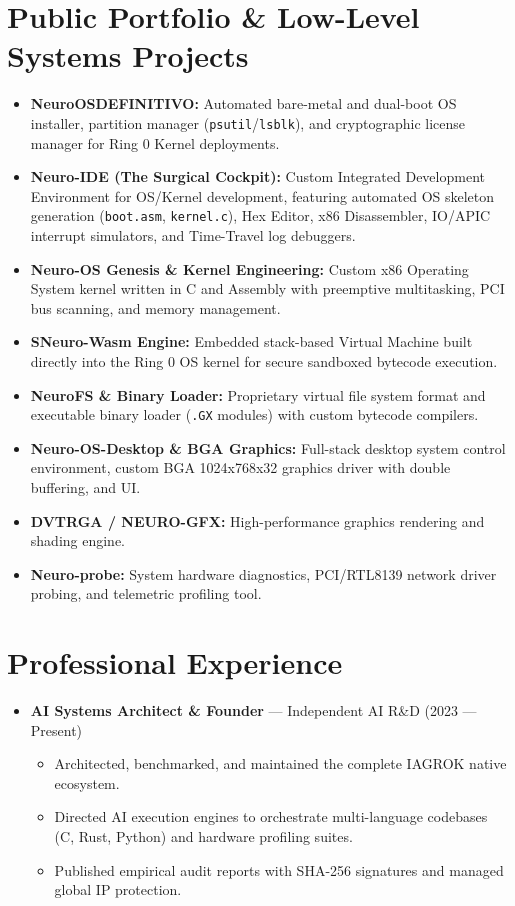 \documentclass[11pt,a4paper,sans]{moderncv}
\begin{document}
\section{Public Portfolio \& Low-Level Systems Projects}
\begin{itemize}
\item \textbf{NeuroOSDEFINITIVO:} Automated bare-metal and dual-boot OS installer, partition manager (\texttt{psutil}/\texttt{lsblk}), and cryptographic license manager for Ring 0 Kernel deployments.
\item \textbf{Neuro-IDE (The Surgical Cockpit):} Custom Integrated Development Environment for OS/Kernel development, featuring automated OS skeleton generation (\texttt{boot.asm}, \texttt{kernel.c}), Hex Editor, x86 Disassembler, IO/APIC interrupt simulators, and Time-Travel log debuggers.
\item \textbf{Neuro-OS Genesis \& Kernel Engineering:} Custom x86 Operating System kernel written in C and Assembly with preemptive multitasking, PCI bus scanning, and memory management.
\item \textbf{SNeuro-Wasm Engine:} Embedded stack-based Virtual Machine built directly into the Ring 0 OS kernel for secure sandboxed bytecode execution.
\item \textbf{NeuroFS \& Binary Loader:} Proprietary virtual file system format and executable binary loader (\texttt{.GX} modules) with custom bytecode compilers.
\item \textbf{Neuro-OS-Desktop \& BGA Graphics:} Full-stack desktop system control environment, custom BGA 1024x768x32 graphics driver with double buffering, and UI.
\item \textbf{DVTRGA / NEURO-GFX:} High-performance graphics rendering and shading engine.
\item \textbf{Neuro-probe:} System hardware diagnostics, PCI/RTL8139 network driver probing, and telemetric profiling tool.
\end{itemize}

\section{Professional Experience}
\begin{itemize}
\item \textbf{AI Systems Architect \& Founder} --- Independent AI R\&D \hfill (2023 --- Present)
  \begin{itemize}
  \item Architected, benchmarked, and maintained the complete IAGROK native ecosystem.
  \item Directed AI execution engines to orchestrate multi-language codebases (C, Rust, Python) and hardware profiling suites.
  \item Published empirical audit reports with SHA-256 signatures and managed global IP protection.
  \end{itemize}
\end{itemize}
\end{document}

